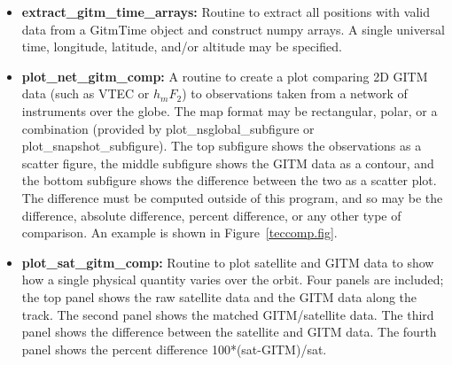 \begin{itemize}
\item[]{\bf extract\_gitm\_time\_arrays: } Routine to extract all positions with valid data from a GitmTime object and construct numpy arrays.  A single universal time, longitude, latitude, and/or altitude may be specified.
\item[]{\bf plot\_net\_gitm\_comp: } A routine to create a plot comparing 2D GITM data (such as VTEC or $h_mF_2$) to observations taken from a network of instruments over the globe.  The map format may be rectangular, polar, or a combination (provided by plot\_nsglobal\_subfigure or plot\_snapshot\_subfigure).  The top subfigure shows the observations as a scatter figure, the middle subfigure shows the GITM data as a contour, and the bottom subfigure shows the difference between the two as a scatter plot.  The difference must be computed outside of this program, and so may be the difference, absolute difference, percent difference, or any other type of comparison.  An example is shown in Figure~\ref{teccomp.fig}.
\item[]{\bf plot\_sat\_gitm\_comp: } Routine to plot satellite and GITM data to show how a single physical quantity varies over the orbit.  Four panels are included; the top panel shows the raw satellite data and the GITM data along the track.  The second panel shows the matched GITM/satellite data.  The third panel shows the difference between the satellite and GITM data.  The fourth panel shows the percent difference 100*(sat-GITM)/sat.
\end{itemize}

